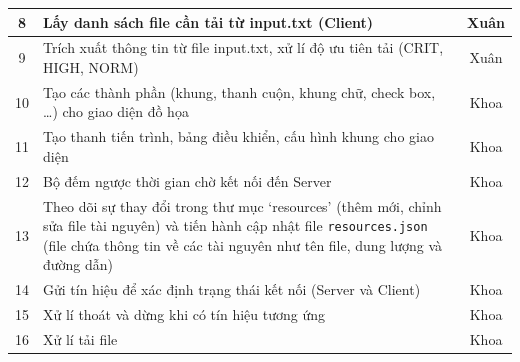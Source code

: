 \documentclass[a4paper,12pt]{report}
\begin{document}
\begin{center}
\begin{tabular}{|c|p{}|c|}
    8            & Lấy danh sách file cần tải từ input.txt (Client)                                                                                                                                                                    & Xuân                     \\\hline
    9            & Trích xuất thông tin từ file input.txt, xử lí độ ưu tiên tải (CRIT, HIGH, NORM)                                                                                                                                     & Xuân                     \\\hline
    10           & Tạo các thành phần (khung, thanh cuộn, khung chữ, check box, \ldots) cho giao diện đồ họa                                                                                                                           & Khoa                     \\\hline
    11           & Tạo thanh tiến trình, bảng điều khiển, cấu hình khung cho giao diện                                                                                                                                                 & Khoa                     \\\hline
    12           & Bộ đếm ngược thời gian chờ kết nối đến Server                                                                                                                                                                       & Khoa                     \\\hline
    13           & Theo dõi sự thay đổi trong thư mục `resources' (thêm mới, chỉnh sửa file tài nguyên) và tiến hành cập nhật file \verb|resources.json| (file chứa thông tin về các tài nguyên như tên file, dung lượng và đường dẫn) & Khoa                     \\\hline
    14           & Gửi tín hiệu để xác định trạng thái kết nối (Server và Client)                                                                                                                                                      & Khoa                     \\\hline
    15           & Xử lí thoát và dừng khi có tín hiệu tương ứng                                                                                                                                                                       & Khoa                     \\\hline
    16           & Xử lí tải file                                                                                                                                                                                                      & Khoa                     \\\hline

\end{tabular}
\end{center}
\end{document}
